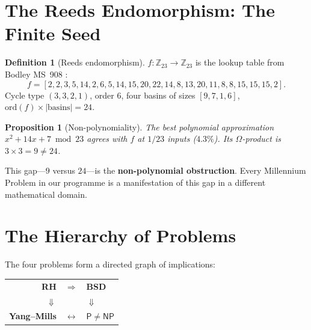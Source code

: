 \documentclass[11pt,a4paper]{article}
\theoremstyle{plain}
\newtheorem{proposition}[theorem]{Proposition}
\theoremstyle{definition}
\newtheorem{definition}[theorem]{Definition}
\theoremstyle{remark}
\begin{document}
\section{The Reeds Endomorphism: The Finite Seed}

\begin{definition}[Reeds endomorphism]
$f: \mathbb{Z}_{23} \to \mathbb{Z}_{23}$ is the lookup table from Bodley MS~908 \cite{DWR2026}:
\[
f = [2,2,3,5,14,2,6,5,14,15,20,22,14,8,13,20,11,8,8,15,15,15,2].
\]
Cycle type $(3,3,2,1)$, order $6$, four basins of sizes $[9,7,1,6]$, $\text{ord}(f) \times |\text{basins}| = 24$.
\end{definition}

\begin{proposition}[Non-polynomiality]
The best polynomial approximation $x^2 + 14x + 7 \bmod 23$ agrees with $f$ at $1/23$ inputs ($4.3\%$). Its $\Omega$-product is $3 \times 3 = 9 \neq 24$.
\end{proposition}

This gap---$9$ versus $24$---is the \textbf{non-polynomial obstruction}. Every Millennium Problem in our programme is a manifestation of this gap in a different mathematical domain.

\section{The Hierarchy of Problems}

The four problems form a directed graph of implications:

\begin{center}
\begin{tabular}{rcl}
\textbf{RH} & $\Longrightarrow$ & \textbf{BSD} \\
$\Downarrow$ & & $\Downarrow$ \\
\textbf{Yang--Mills} & $\longleftrightarrow$ & $\mathsf{P} \neq \mathsf{NP}$ \\
\end{tabular}
\end{center}
\end{document}
